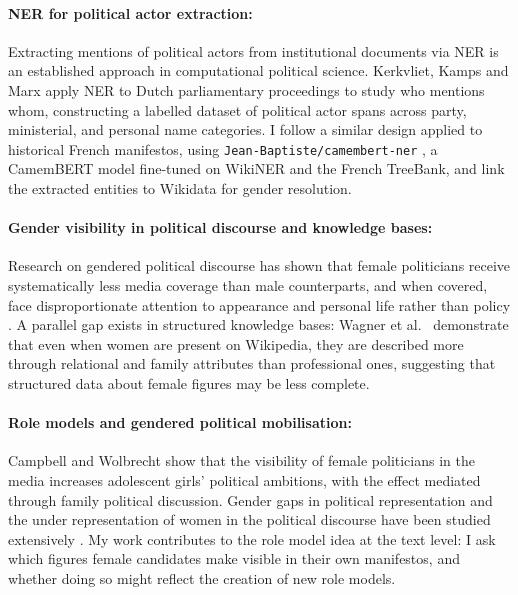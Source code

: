 \documentclass{article}
\begin{document}
\paragraph{NER for political actor extraction:}
Extracting mentions of political actors from institutional documents via NER is an established approach in computational political science. Kerkvliet, Kamps and Marx \cite{kerkvliet2020} apply NER to Dutch parliamentary proceedings to study who mentions whom, constructing a labelled dataset of political actor spans across party, ministerial, and personal name categories. I follow a similar design applied to historical French manifestos, using \texttt{Jean-Baptiste/camembert-ner} \cite{martin2020camembert}, a CamemBERT model fine-tuned on WikiNER and the French TreeBank, and link the extracted entities to Wikidata for gender resolution.

\paragraph{Gender visibility in political discourse and knowledge bases:}
Research on gendered political discourse has shown that female politicians receive systematically less media coverage than male counterparts, and when covered, face disproportionate attention to appearance and personal life rather than policy \cite{vderpas2020}. A parallel gap exists in structured knowledge bases: Wagner et al.\ \cite{wagner2015} demonstrate that even when women are present on Wikipedia, they are described more through relational and family attributes than professional ones, suggesting that structured data about female figures may be less complete.

\paragraph{Role models and gendered political mobilisation:}
Campbell and Wolbrecht \cite{campbell2006} show that the visibility of female politicians in the media increases adolescent girls' political ambitions, with the effect mediated through family political discussion. Gender gaps in political representation and the under representation of women in the political discourse have been studied extensively \cite{norris1997passages, celis2008, lawless2004}. My work contributes to the role model idea at the text level: I ask which figures female candidates make visible in their own manifestos, and whether doing so might reflect the creation of new role models.
\end{document}
